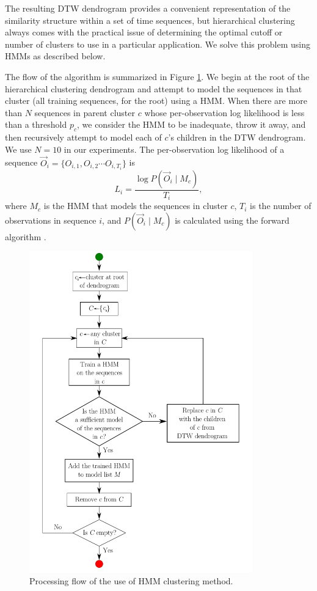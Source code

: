 The resulting DTW dendrogram provides a convenient representation of
the similarity structure within a set of time sequences, but
hierarchical clustering always comes with the practical issue of
determining the optimal cutoff or number of clusters to use in a
particular application.  We solve this problem using HMMs as described
below.

The flow of the algorithm is summarized in
Figure \ref{fig:flow-diagram}.  We begin at the root of the
hierarchical clustering dendrogram and attempt to model the sequences
in that cluster (all training sequences, for the root) using a
HMM. When there are more than $N$ sequences in parent cluster $c$
whose per-observation log likelihood is less than a threshold $p_c$,
we consider the HMM to be inadequate, throw it away, and then
recursively attempt to model each of $c$'s children in the DTW
dendrogram.  We use $N=10$ in our experiments. The per-observation log
likelihood of a sequence $\vec{O}_i = \{ O_{i, 1}, O_{i, 2} \cdots
O_{i, T_i} \}$ is
\[
  L_{i} = \frac{\log P( \vec{O}_i \mid M_c )}{T_i},
\]
where $M_c$ is the HMM that models the sequences in cluster $c$, $T_i$
is the number of observations in sequence $i$, and $P(\vec{O}_i
\mid M_c)$ is calculated using the forward algorithm .


\begin{figure}[t]
  \begin{center} \includegraphics[width=3.8in]{figures/clustering-flow-diagram} \end{center} \caption[Processing
    flow of the use of HMM clustering method.]{\small Processing flow
    of the use of HMM clustering method.}  \label{fig:flow-diagram}
\end{figure}

